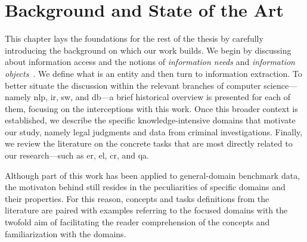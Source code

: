\chapter{Background and State of the Art}
\label{chap:background_soa}




This chapter lays the foundations for the rest of the thesis by carefully introducing the background on which our work builds. We begin by discussing about information access and the notions of \emph{information needs} and \emph{information objects}~\cite{entityorientedsearch2018balog}. We define what is an entity and then turn to information extraction. To better situate the discussion within the relevant branches of computer science---namely \acl{nlp}, \acl{ir}, \acl{sw}, and \acl{db}---a brief historical overview is presented for each of them, focusing on the interceptions with this work. Once this broader context is established, we describe the specific knowledge-intensive domains that motivate our study, namely legal judgments and data from criminal investigations. Finally, we review the literature on the concrete tasks that are most directly related to our research---such as \acl{er}, \acl{el}, \acl{cr}, and \acl{qa}.

Although part of this \phd work has been applied to general-domain benchmark data, the motivaton behind still resides in the peculiarities of specific domains and their properties.
For this reason, concepts and tasks definitions from the literature are paired with examples referring to the focused domains with the twofold aim of facilitating the reader comprehension of the concepts and familiarization with the domains.  




